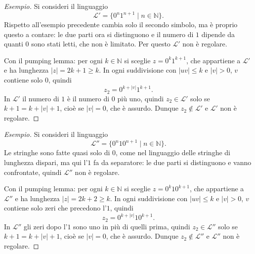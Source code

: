 \documentclass[a4paper, 11pt, oneside]{book}
\theoremstyle{formale}
\newenvironment{esempio}
    {\begin{proof}[\textit{Esempio}]\renewcommand{\qedsymbol}{$\diamond$}}
    {\end{proof}}
\begin{document}
    \begin{esempio}
        Si consideri il linguaggio
        \begin{equation*}
            \mathcal{L}' = \{0^n 1^{n+1} \mid n \in \mathbb{N}\}.
        \end{equation*}
        Rispetto all'esempio precedente cambia solo il secondo simbolo, ma \`e proprio
        questo a contare: le due parti ora si distinguono e il numero di $1$ dipende da
        quanti $0$ sono stati letti, che non \`e limitato. Per questo $\mathcal{L}'$
        non \`e regolare.

        Con il pumping lemma: per ogni $k \in \mathbb{N}$ si sceglie
        $z = 0^k 1^{k+1}$, che appartiene a $\mathcal{L}'$ e ha lunghezza
        $|z| = 2k + 1 \geq k$. In ogni suddivisione con $|uv| \leq k$ e $|v| > 0$, $v$
        contiene solo $0$, quindi
        \begin{equation*}
            z_2 = 0^{k + |v|} 1^{k+1}.
        \end{equation*}
        In $\mathcal{L}'$ il numero di $1$ \`e il numero di $0$ pi\`u uno, quindi
        $z_2 \in \mathcal{L}'$ solo se $k + 1 = k + |v| + 1$, cio\`e se $|v| = 0$, che \`e
        assurdo. Dunque $z_2 \notin \mathcal{L}'$ e $\mathcal{L}'$ non \`e regolare.
    \end{esempio}

    \begin{esempio}
        Si consideri il linguaggio
        \begin{equation*}
            \mathcal{L}'' = \{0^n 1 0^{n+1} \mid n \in \mathbb{N}\}.
        \end{equation*}
        Le stringhe sono fatte quasi solo di $0$, come nel linguaggio delle stringhe di
        lunghezza dispari, ma qui l'$1$ fa da separatore: le due parti si distinguono e
        vanno confrontate, quindi $\mathcal{L}''$ non \`e regolare.

        Con il pumping lemma: per ogni $k \in \mathbb{N}$ si sceglie
        $z = 0^k 1 0^{k+1}$, che appartiene a $\mathcal{L}''$ e ha lunghezza
        $|z| = 2k + 2 \geq k$. In ogni suddivisione con $|uv| \leq k$ e $|v| > 0$, $v$
        contiene solo zeri che precedono l'$1$, quindi
        \begin{equation*}
            z_2 = 0^{k + |v|} 1 0^{k+1}.
        \end{equation*}
        In $\mathcal{L}''$ gli zeri dopo l'$1$ sono uno in pi\`u di quelli prima, quindi
        $z_2 \in \mathcal{L}''$ solo se $k + 1 = k + |v| + 1$, cio\`e se $|v| = 0$, che \`e
        assurdo. Dunque $z_2 \notin \mathcal{L}''$ e $\mathcal{L}''$ non \`e regolare.
    \end{esempio}
\end{document}
